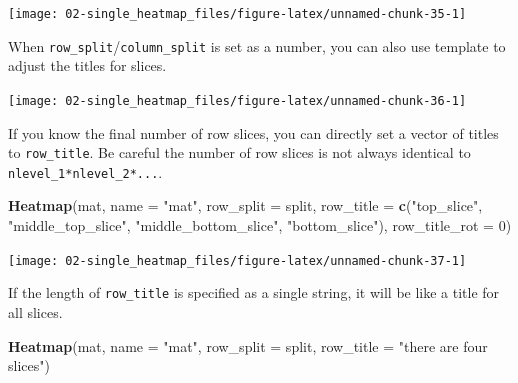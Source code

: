 \documentclass[]{book}
\newenvironment{Shaded}{\begin{snugshade}}{\end{snugshade}}
\newcommand{\KeywordTok}[1]{\textcolor[rgb]{0.13,0.29,0.53}{\textbf{#1}}}
\newcommand{\DataTypeTok}[1]{\textcolor[rgb]{0.13,0.29,0.53}{#1}}
\newcommand{\DecValTok}[1]{\textcolor[rgb]{0.00,0.00,0.81}{#1}}
\newcommand{\StringTok}[1]{\textcolor[rgb]{0.31,0.60,0.02}{#1}}
\newcommand{\NormalTok}[1]{#1}
\theoremstyle{definition}
\theoremstyle{definition}
\theoremstyle{definition}
\theoremstyle{remark}
\begin{document}
\begin{center}\texttt{[image: 02-single\_heatmap\_files/figure-latex/unnamed-chunk-35-1]} \end{center}

When \texttt{row\_split}/\texttt{column\_split} is set as a number, you
can also use template to adjust the titles for slices.

\begin{Shaded}
\end{Shaded}

\begin{center}\texttt{[image: 02-single\_heatmap\_files/figure-latex/unnamed-chunk-36-1]} \end{center}

If you know the final number of row slices, you can directly set a
vector of titles to \texttt{row\_title}. Be careful the number of row
slices is not always identical to \texttt{nlevel\_1*nlevel\_2*...}.

\begin{Shaded}
\begin{Highlighting}[]
\KeywordTok{Heatmap}\NormalTok{(mat, }\DataTypeTok{name =} \StringTok{"mat"}\NormalTok{, }\DataTypeTok{row_split =}\NormalTok{ split, }
    \DataTypeTok{row_title =} \KeywordTok{c}\NormalTok{(}\StringTok{"top_slice"}\NormalTok{, }\StringTok{"middle_top_slice"}\NormalTok{, }\StringTok{"middle_bottom_slice"}\NormalTok{, }\StringTok{"bottom_slice"}\NormalTok{),}
    \DataTypeTok{row_title_rot =} \DecValTok{0}\NormalTok{)}
\end{Highlighting}
\end{Shaded}

\begin{center}\texttt{[image: 02-single\_heatmap\_files/figure-latex/unnamed-chunk-37-1]} \end{center}

If the length of \texttt{row\_title} is specified as a single string, it
will be like a title for all slices.

\begin{Shaded}
\begin{Highlighting}[]
\KeywordTok{Heatmap}\NormalTok{(mat, }\DataTypeTok{name =} \StringTok{"mat"}\NormalTok{, }\DataTypeTok{row_split =}\NormalTok{ split, }\DataTypeTok{row_title =} \StringTok{"there are four slices"}\NormalTok{)}
\end{Highlighting}
\end{Shaded}
\end{document}
